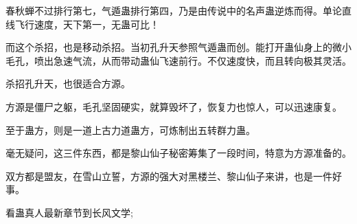 \begin{this_body}
春秋蝉不过排行第七，气遁蛊排行第四，乃是由传说中的名声蛊逆炼而得。单论直线飞行速度，天下第一，无蛊可比！

而这个杀招，也是移动杀招。当初孔升天参照气遁蛊而创。能打开蛊仙身上的微小毛孔，喷出急速气流，从而带动蛊仙飞速前行。不仅速度快，而且转向极其灵活。

杀招孔升天，也很适合方源。

方源是僵尸之躯，毛孔坚固硬实，就算毁坏了，恢复力也惊人，可以迅速康复。

至于蛊方，则是一道上古力道蛊方，可炼制出五转群力蛊。

毫无疑问，这三件东西，都是黎山仙子秘密筹集了一段时间，特意为方源准备的。

双方都是盟友，在雪山立誓，方源的强大对黑楼兰、黎山仙子来讲，也是一件好事。

看蛊真人最新章节到长风文学;

\end{this_body}

